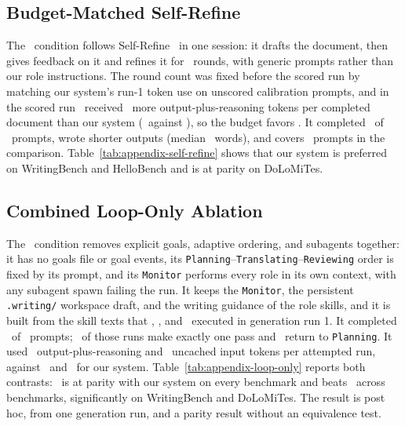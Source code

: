 \subsection{Budget-Matched Self-Refine}
\label{app:self-refine}
The \condSelfRefine\ condition follows Self-Refine~\citep{madaan2023self} in one session: it drafts the document, then gives feedback on it and refines it for \SelfRefineRounds\ rounds, with generic prompts rather than our role instructions.
The round count was fixed before the scored run by matching our system's run-1 token use on unscored calibration prompts, and in the scored run \condSelfRefine\ received \SelfRefineTokenExcess\ more output-plus-reasoning tokens per completed document than our system (\SelfRefineOutputTokens\ against \SelfRefineAfourOutputTokens), so the budget favors \condSelfRefine.
It completed \SelfRefineCompleted\ of \CogWriterStyleAttempted\ prompts, wrote shorter outputs (median \SelfRefineMedianOutput\ words), and covers \FullSelfRefineAcrossN\ prompts in the comparison.
Table~\ref{tab:appendix-self-refine} shows that our system is preferred on WritingBench and HelloBench and is at parity on DoLoMiTes.


\subsection{Combined Loop-Only Ablation}
\label{app:loop-only}
The \condLoopOnly\ condition removes explicit goals, adaptive ordering, and subagents together: it has no goals file or goal events, its \texttt{Planning}--\texttt{Translating}--\texttt{Reviewing} order is fixed by its prompt, and its \texttt{Monitor} performs every role in its own context, with any subagent spawn failing the run.
It keeps the \texttt{Monitor}, the persistent \texttt{.writing/} workspace draft, and the writing guidance of the role skills, and it is built from the skill texts that \condNoGoals, \condFixedOrder, and \condSingleContext\ executed in generation run 1.
It completed \LoopOnlyCompleted\ of \CogWriterStyleAttempted\ prompts; \LoopOnlyOnePassRuns\ of those runs make exactly one pass and \LoopOnlyReturnPlanningRuns\ return to \texttt{Planning}.
It used \LoopOnlyOutputTokens\ output-plus-reasoning and \LoopOnlyInputTokens\ uncached input tokens per attempted run, against \AfourOutputTokens\ and \AfourInputTokens\ for our system.
Table~\ref{tab:appendix-loop-only} reports both contrasts: \condLoopOnly\ is at parity with our system on every benchmark and beats \condStaged\ across benchmarks, significantly on WritingBench and DoLoMiTes.
The result is post hoc, from one generation run, and a parity result without an equivalence test.


